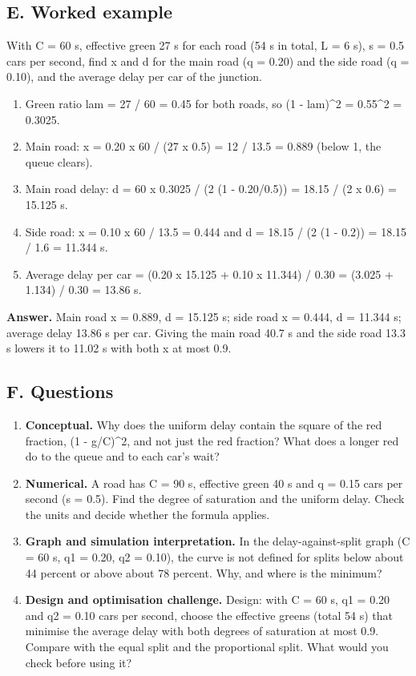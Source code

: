 \documentclass[11pt,a4paper]{article}
\begin{document}
\subsection*{E. Worked example}
With C = 60 s, effective green 27 s for each road (54 s in total, L = 6 s), s = 0.5 cars per second, find x and d for the main road (q = 0.20) and the side road (q = 0.10), and the average delay per car of the junction.
\begin{enumerate}[nosep]
\item Green ratio lam = 27 / 60 = 0.45 for both roads, so (1 - lam)\textasciicircum{}2 = 0.55\textasciicircum{}2 = 0.3025.
\item Main road: x = 0.20 x 60 / (27 x 0.5) = 12 / 13.5 = 0.889 (below 1, the queue clears).
\item Main road delay: d = 60 x 0.3025 / (2 (1 - 0.20/0.5)) = 18.15 / (2 x 0.6) = 15.125 s.
\item Side road: x = 0.10 x 60 / 13.5 = 0.444 and d = 18.15 / (2 (1 - 0.2)) = 18.15 / 1.6 = 11.344 s.
\item Average delay per car = (0.20 x 15.125 + 0.10 x 11.344) / 0.30 = (3.025 + 1.134) / 0.30 = 13.86 s.
\end{enumerate}
\textbf{Answer.} Main road x = 0.889, d = 15.125 s; side road x = 0.444, d = 11.344 s; average delay 13.86 s per car. Giving the main road 40.7 s and the side road 13.3 s lowers it to 11.02 s with both x at most 0.9.

\subsection*{F. Questions}
\begin{enumerate}[nosep]
\item \textbf{Conceptual.} Why does the uniform delay contain the square of the red fraction, (1 - g/C)\textasciicircum{}2, and not just the red fraction? What does a longer red do to the queue and to each car's wait?
\item \textbf{Numerical.} A road has C = 90 s, effective green 40 s and q = 0.15 cars per second (s = 0.5). Find the degree of saturation and the uniform delay. Check the units and decide whether the formula applies.
\item \textbf{Graph and simulation interpretation.} In the delay-against-split graph (C = 60 s, q1 = 0.20, q2 = 0.10), the curve is not defined for splits below about 44 percent or above about 78 percent. Why, and where is the minimum?
\item \textbf{Design and optimisation challenge.} Design: with C = 60 s, q1 = 0.20 and q2 = 0.10 cars per second, choose the effective greens (total 54 s) that minimise the average delay with both degrees of saturation at most 0.9. Compare with the equal split and the proportional split. What would you check before using it?
\end{enumerate}
\end{document}
